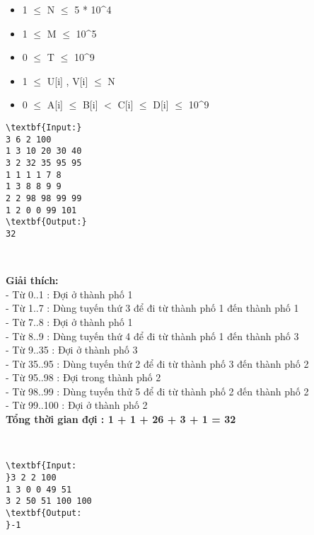 \begin{itemize}
	\item 1  $\le$  N  $\le$  5 * 10^4
	\item 1  $\le$  M  $\le$  10^5
	\item 0  $\le$  T  $\le$  10^9
	\item 1  $\le$  U[i] , V[i]  $\le$  N
	\item 0  $\le$  A[i]  $\le$  B[i] $<$ C[i]  $\le$  D[i]  $\le$  10^9
\end{itemize}
\begin{verbatim}
\textbf{Input:}
3 6 2 100
1 3 10 20 30 40
3 2 32 35 95 95
1 1 1 1 7 8
1 3 8 8 9 9
2 2 98 98 99 99
1 2 0 0 99 101
\textbf{Output:}
32\end{verbatim}

 

\textbf{Giải thích:}
\\- Từ 0..1 : Đợi ở thành phố 1
\\- Từ 1..7 : Dùng tuyến thứ 3 để đi từ thành phố 1 đến thành phố 1
\\- Từ 7..8 : Đợi ở thành phố 1
\\- Từ 8..9 : Dùng tuyến thứ 4 để đi từ thành phố 1 đến thành phố 3
\\- Từ 9..35 : Đợi ở thành phố 3
\\- Từ 35..95 : Dùng tuyến thứ 2 để đi từ thành phố 3 đến thành phố 2
\\- Từ 95..98 : Đợi trong thành phố 2
\\- Từ 98..99 : Dùng tuyến thử 5 để đi từ thành phố 2 đến thành phố 2
\\- Từ 99..100 : Đợi ở thành phố 2
\\\textbf{Tổng thời gian đợi : 1 + 1 + 26 + 3 + 1 = 32}

 
\begin{verbatim}
\textbf{Input:
}3 2 2 100
1 3 0 0 49 51
3 2 50 51 100 100
\textbf{Output:
}-1
\end{verbatim}